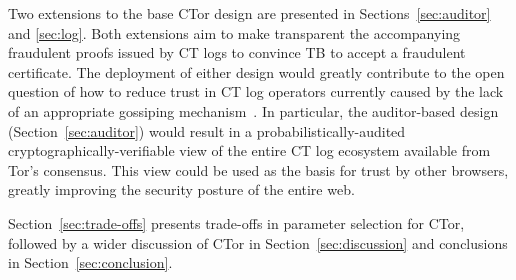 Two extensions to the base CTor design are presented in
Sections~\ref{sec:auditor} and \ref{sec:log}. Both extensions aim to make
transparent the accompanying fraudulent proofs issued by CT logs to convince TB
to accept a fraudulent certificate. The deployment of either design would
greatly contribute to the open question of how to reduce trust in CT log operators
currently caused by the lack of an appropriate gossiping mechanism~\cite{FIXME}.
In particular, the auditor-based design (Section~\ref{sec:auditor}) would result
in a probabilistically-audited cryptographically-verifiable view of the entire
CT log ecosystem available from Tor's consensus. This view could be used as the
basis for trust by other browsers, greatly improving the security posture of the
entire web.

Section~\ref{sec:trade-offs} presents trade-offs in parameter selection for
CTor, followed by a wider discussion of CTor in Section~\ref{sec:discussion} and
conclusions in Section~\ref{sec:conclusion}.

